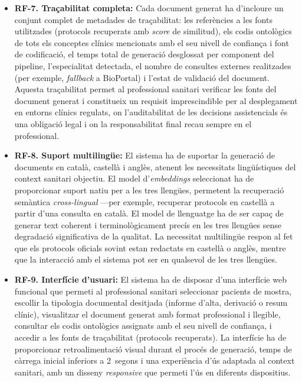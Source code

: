 \documentclass[CAT]{TFUOC}%
\begin{document}
\begin{itemize}
    \item \textbf{RF-7. Traçabilitat completa:} Cada document generat ha d'incloure un conjunt complet de metadades de traçabilitat: les referències a les fonts utilitzades (protocols recuperats amb \textit{score} de similitud), els codis ontològics de tots els conceptes clínics mencionats amb el seu nivell de confiança i font de codificació, el temps total de generació desglossat per component del pipeline, l'especialitat detectada, el nombre de consultes externes realitzades (per exemple, \textit{fallback} a BioPortal) i l'estat de validació del document. Aquesta traçabilitat permet al professional sanitari verificar les fonts del document generat i constitueix un requisit imprescindible per al desplegament en entorns clínics regulats, on l'auditabilitat de les decisions assistencials és una obligació legal i on la responsabilitat final recau sempre en el professional.

    \item \textbf{RF-8. Suport multilingüe:} El sistema ha de suportar la generació de documents en català, castellà i anglès, atenent les necessitats lingüístiques del context sanitari objectiu. El model d'\textit{embeddings} seleccionat ha de proporcionar suport natiu per a les tres llengües, permetent la recuperació semàntica \textit{cross-lingual} ---per exemple, recuperar protocols en castellà a partir d'una consulta en català. El model de llenguatge ha de ser capaç de generar text coherent i terminològicament precís en les tres llengües sense degradació significativa de la qualitat. La necessitat multilingüe respon al fet que els protocols oficials sovint estan redactats en castellà o anglès, mentre que la interacció amb el sistema pot ser en qualsevol de les tres llengües.

    \item \textbf{RF-9. Interfície d'usuari:} El sistema ha de disposar d'una interfície web funcional que permeti al professional sanitari seleccionar pacients de mostra, escollir la tipologia documental desitjada (informe d'alta, derivació o resum clínic), visualitzar el document generat amb format professional i llegible, consultar els codis ontològics assignats amb el seu nivell de confiança, i accedir a les fonts de traçabilitat (protocols recuperats). La interfície ha de proporcionar retroalimentació visual durant el procés de generació, temps de càrrega inicial inferiors a 2~segons i una experiència d'ús adaptada al context sanitari, amb un disseny \textit{responsive} que permeti l'ús en diferents dispositius.
\end{itemize}
\end{document}
